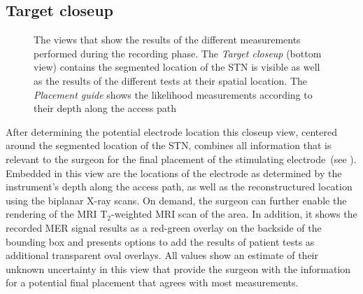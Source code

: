 \subsection{Target closeup} \label{contributions:dbs:target}
\begin{figure}
\caption{The views that show the results of the different measurements performed during the recording phase. The \emph{Target closeup} (bottom view) contains the segmented location of the STN is visible as well as the results of the different tests at their spatial location. The \emph{Placement guide} shows the likelihood measurements according to their depth along the access path}
\label{contributions:dbs:target}
\end{figure}

After determining the potential electrode location this closeup view, centered around the segmented location of the STN, combines all information that is relevant to the surgeon for the final placement of the stimulating electrode~(see ).  Embedded in this view are the locations of the electrode as determined by the instrument's depth along the access path, as well as the reconstructured location using the biplanar X-ray scans.  On demand, the surgeon can further enable the rendering of the MRI T$_2$-weighted MRI scan of the area.  In addition, it shows the recorded MER signal results as a red-green overlay on the backside of the bounding box and presents options to add the results of patient tests as additional transparent oval overlays.  All values show an estimate of their unknown uncertainty in this view that provide the surgeon with the information for a potential final placement that agrees with most measurements.





